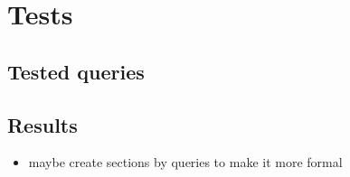 \chapter{Tests}
\label{chap:Tests}

\section{Tested queries}
\section{Results}

\begin{itemize}
\item maybe create sections by queries to make it more formal
\end{itemize}
